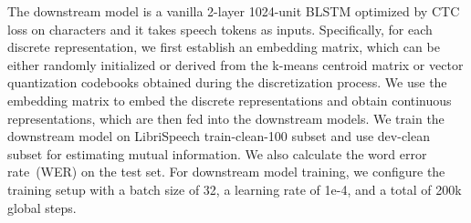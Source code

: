 The downstream model is a vanilla 2-layer 1024-unit BLSTM optimized by CTC loss on characters and it takes speech tokens as inputs. Specifically, for each discrete representation, we first establish an embedding matrix, which can be either randomly initialized or derived from the k-means centroid matrix or vector quantization codebooks obtained during the discretization process. We use the embedding matrix to embed the discrete representations and obtain continuous representations, which are then fed into the downstream models. We train the downstream model on LibriSpeech train-clean-100 subset and use dev-clean subset for estimating mutual information. We also calculate the word error rate~(WER) on the test set.
For downstream model training, we configure the training setup with a batch size of 32, a learning rate of 1e-4, and a total of 200k global steps.





